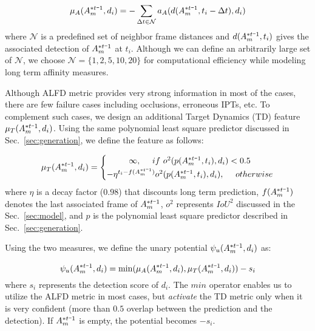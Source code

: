 \documentclass[10pt,twocolumn,letterpaper]{article}
\newcommand{\minus}{\scalebox{0.5}[1.0]{$-$}}
\begin{document}
{\footnotesize
\begin{equation}
	\mu_A (A_m^{* t\minus 1}, d_i) = - \sum_{\Delta t \in \mathcal{N}} a_A(d(A_m^{* t\minus 1}, t_i - \Delta t), d_i)
\end{equation}}
where $\mathcal{N}$ is a predefined set of neighbor frame distances and $d(A_m^{* t\minus 1}, t_i)$ gives the associated detection of $A_m^{* t\minus 1}$ at $t_i$. Although we can define an arbitrarily large set of $\mathcal{N}$, we choose $\mathcal{N} = \{1, 2, 5, 10, 20\}$ for computational efficiency while modeling long term affinity measures. 

Although ALFD metric provides very strong information in most of the cases, there are few failure cases including occlusions, erroneous IPTs, etc. To complement such cases, we design an additional Target Dynamics (TD) feature $\mu_T (A_m^{* t\minus 1}, d_i)$. Using the same polynomial least square predictor discussed in Sec.~\ref{sec:generation}, we define the feature as follows:

{\footnotesize
\begin{equation}
\mu_T(A_m^{* t \minus 1}, d_i) = 
\left\{\begin{matrix}
\infty,\ \ \ \ if\ o^2(p(A_m^{* t \minus 1}, t_i), d_i) < 0.5\\ 
-\eta^{t_i - f(A_m^{* t \minus 1})} o^2(p(A_m^{* t \minus 1}, t_i), d_i),\ \ \ \ otherwise
\end{matrix}\right.
\end{equation}}
where $\eta$ is a decay factor ($0.98$) that discounts long term prediction, $f(A_m^{* t \minus 1})$ denotes the last associated frame of $A_m^{* t \minus 1}$, $o^2$ represents $IoU^2$ discussed in the Sec.~\ref{sec:model}, and $p$ is the polynomial least square predictor described in Sec.~\ref{sec:generation}. 

Using the two measures, we define the unary potential $\psi_u(A_m^{* t \minus 1}, d_i)$ as:

{\footnotesize
\begin{equation}
\psi_u(A_m^{* t \minus 1}, d_i) = \min(\mu_A(A_m^{* t \minus 1}, d_i), \mu_T(A_m^{* t \minus 1}, d_i)) - s_i
\end{equation}
}
where $s_i$ represents the detection score of $d_i$. The $min$ operator enables us to utilize the ALFD metric in most cases, but \emph{activate} the TD metric only when it is very confident (more than $0.5$ overlap between the prediction and the detection). If $A_m^{* t \minus 1}$ is empty, the potential becomes $-s_i$.
\end{document}
